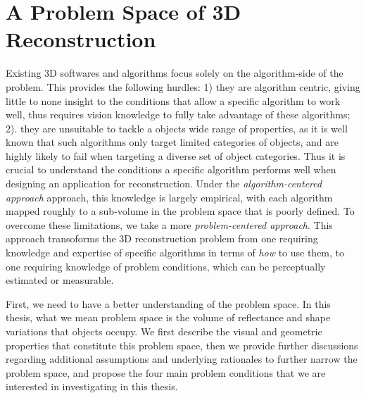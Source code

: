 
\chapter{A Problem Space of 3D Reconstruction}
\label{ch:3DRecon_ProbSpace}
Existing 3D softwares and algorithms focus solely on the algorithm-side of the problem. This provides the following hurdles: 1) they are algorithm centric, giving little to none insight to the conditions that allow a specific algorithm to work well, thus requires vision knowledge to fully take advantage of these algorithms; 2). they are unsuitable to tackle a objects wide range of properties, as it is well known that such algorithms only target limited categories of objects, and are highly likely to fail when targeting a diverse set of object categories. Thus it is crucial to understand the conditions a specific algorithm performs well when designing an application for reconstruction. Under the \textit{algorithm-centered approach} approach, this knowledge is largely empirical, with each algorithm mapped roughly to a sub-volume in the problem space that is poorly defined. To overcome these limitations, we take a more \textit{problem-centered approach}. This approach transoforms the 3D reconstruction problem from one requiring knowledge and expertise of specific algorithms in terms of \textit{how} to use them, to one requiring knowledge of problem conditions, which can be perceptually estimated or measurable.

First, we need to have a better understanding of the problem space. In this thesis, what we mean problem space is the volume of reflectance and shape variations that objects occupy. We first describe the visual and geometric properties that constitute this problem space, then we provide further discussions regarding additional assumptions and underlying rationales to further narrow the problem space, and propose the four main problem conditions that we are interested in investigating in this thesis.

